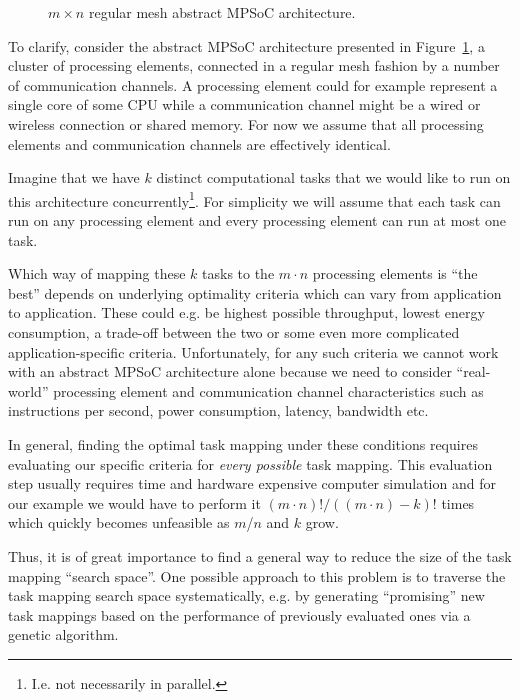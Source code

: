 \begin{figure}
  \centering
  \caption{$m \times n$ regular mesh abstract MPSoC architecture.}
  \label{fig:regular_mesh_m_n}
\end{figure}

To clarify, consider the abstract MPSoC architecture presented in
Figure~\ref{fig:regular_mesh_m_n}, a cluster of processing elements, connected
in a regular mesh fashion by a number of communication channels. A processing
element could for example represent a single core of some CPU while a
communication channel might be a wired or wireless connection or shared memory.
For now we assume that all processing elements and communication channels are
effectively identical.

Imagine that we have $k$ distinct computational tasks that we would like to run
on this architecture concurrently\footnote{I.e. not necessarily in parallel.}.
For simplicity we will assume that each task can run on any processing element
and every processing element can run at most one task.

Which way of mapping these $k$ tasks to the $m \cdot n$ processing elements is
``the best'' depends on underlying optimality criteria which can vary from
application to application. These could e.g. be highest possible throughput,
lowest energy consumption, a trade-off between the two or some even more
complicated application-specific criteria.
%
Unfortunately, for any such criteria we cannot work with an abstract MPSoC
architecture alone because we need to consider ``real-world'' processing
element and communication channel characteristics such as instructions per
second, power consumption, latency, bandwidth etc.

In general, finding the optimal task mapping under these conditions requires
evaluating our specific criteria for \textit{every possible} task mapping. This
evaluation step usually requires time and hardware expensive computer
simulation and for our example we would have to perform it $(m \cdot n)! / ((m
\cdot n) - k)!$ times which quickly becomes unfeasible as $m$/$n$ and $k$ grow.

Thus, it is of great importance to find a general way to reduce the size of the
task mapping ``search space''. One possible approach to this problem is to
traverse the task mapping search space systematically, e.g. by generating
``promising'' new task mappings based on the performance of previously
evaluated ones via a genetic algorithm.

